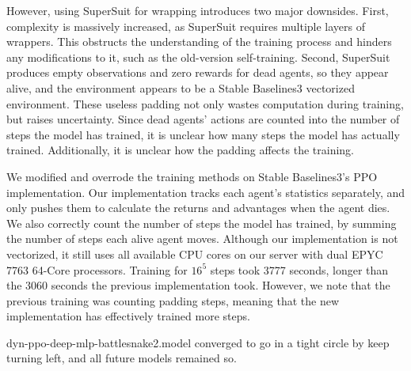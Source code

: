\documentclass[a4paper]{article}
\begin{document}
However, using SuperSuit for wrapping introduces two major downsides. First,
complexity is massively increased,
as SuperSuit requires multiple layers of wrappers.
This obstructs the understanding of the training process and hinders any
modifications to it, such as the old-version self-training. Second,
SuperSuit produces empty observations and zero rewards for dead agents,
so they appear alive,
and the environment appears to be a Stable Baselines3 vectorized environment.
These useless padding not only wastes computation during training,
but raises uncertainty.
Since dead agents' actions are counted into the number of steps the model has
trained, it is unclear how many steps the model has actually trained.
Additionally, it is unclear how the padding affects the training.

We modified and overrode the training methods on Stable Baselines3's PPO
implementation. Our implementation tracks each agent's statistics separately,
and only pushes them to calculate the returns and advantages when the agent
dies. We also correctly count the number of steps the model has trained,
by summing the number of steps each alive agent moves.
Although our implementation is not vectorized,
it still uses all available CPU cores on our server with dual EPYC 7763 64-Core
processors. Training for $16^5$ steps took 3777 seconds,
longer than the 3060 seconds the previous implementation took. However,
we note that the previous training was counting padding steps,
meaning that the new implementation has effectively trained more steps.

dyn-ppo-deep-mlp-battlesnake2.model converged to go in a tight circle by keep
turning left, and all future models remained so.

\printbibliography
\end{document}

